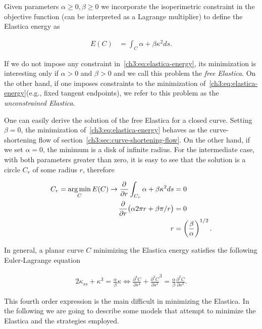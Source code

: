 Given parameters $\alpha \geq 0, \beta \geq 0$ we incorporate the isoperimetric constraint in the objective function (can be interpreted as a Lagrange multiplier) to define the Elastica energy as

\begin{align}
	E(C) &= \int_{C}{\alpha + \beta \kappa^2 ds}.
	\label{ch3:eq:elastica-energy}
\end{align}

If we do not impose any constraint in~\cref{ch3:eq:elastica-energy}, its minimization is interesting only if $\alpha >0$ and $\beta >0$ and we call this problem the \emph{free Elastica}. On the other hand, if one imposes constraints to the minimization of~\cref{ch3:eq:elastica-energy}(e.g., fixed tangent endpoints), we refer to this problem as the \emph{unconstrained Elastica}.

One can easily derive the solution of the free Elastica for a closed curve. Setting $\beta=0$, the minimization of~\cref{ch3:eq:elastica-energy} behaves as the curve-shortening flow of section~\cref{ch3:sec:curve-shortening-flow}. On the other hand, if we set $\alpha =0$, the minimum is a disk of infinite radius. For the intermediate case, with both parameters greater than zero, it is easy to see that the solution is a circle $C_r$ of some radius $r$, therefore

\begin{align*}
	C_r = \operatorname*{arg\,min}_C E(C) \rightarrow \frac{ \partial}{\partial r} \int_{C_r}{\alpha + \beta \kappa^2 ds} &= 0 \\
	\frac{\partial}{\partial r} \big( \alpha 2\pi r + \beta \pi/r \big) & = 0 \\
	r &= \left(\frac{\beta}{\alpha}\right)^{1/2}.
\end{align*}

In general, a planar curve $C$ minimizing the Elastica energy satisfies the following Euler-Lagrange equation~\cite{chan02elasticainpainting,singer08lectures}

\begin{align}
		2\kappa_{ss} + \kappa^3 = \frac{\alpha}{\beta}\kappa \Leftrightarrow \frac{\partial ^4 C}{\partial s^4} + \frac{\partial ^2 C}{\partial s^2}^3 = \frac{\alpha}{\beta}\frac{\partial ^2 C}{\partial s^2}.
		\label{ch3:eq:euler-lagrange-equation-elastica}
\end{align}


This fourth order expression is the main difficult in minimizing the Elastica. In the following we are going to describe some models that attempt to minimize the Elastica and the strategies employed.

